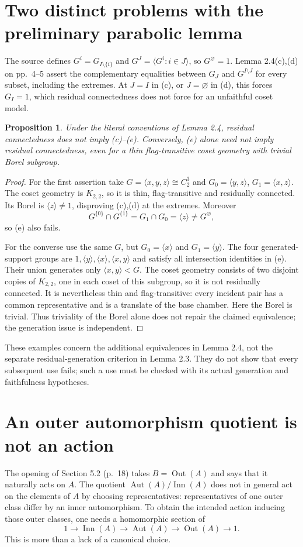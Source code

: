 \documentclass[11pt,a4paper]{article}
\newtheorem{proposition}{Proposition}
\newcommand{\Aut}{\operatorname{Aut}}
\newcommand{\Inn}{\operatorname{Inn}}
\newcommand{\Out}{\operatorname{Out}}
\begin{document}
\section{Two distinct problems with the preliminary parabolic lemma}
The source defines $G^i=G_{I\setminus\{i\}}$ and
$G^J=\langle G^i:i\in J\rangle$, so $G^\varnothing=1$. Lemma 2.4(c),(d)
on pp.~4--5 assert the complementary equalities between $G_J$ and
$G^{I\setminus J}$ for every subset, including the extremes. At $J=I$
in (c), or $J=\varnothing$ in (d), this forces $G_I=1$, which residual
connectedness does not force for an unfaithful coset model.

\begin{proposition}\label{p:lemma}
Under the literal conventions of Lemma 2.4, residual connectedness does
not imply (c)--(e). Conversely, (e) alone need not imply residual
connectedness, even for a thin flag-transitive coset geometry with trivial
Borel subgroup.
\end{proposition}
\begin{proof}
For the first assertion take $G=\langle x,y,z\rangle\cong C_2^3$ and
$G_0=\langle y,z\rangle$, $G_1=\langle x,z\rangle$. The coset geometry is
$K_{2,2}$, so it is thin, flag-transitive and residually connected. Its
Borel is $\langle z\rangle\ne1$, disproving (c),(d) at the extremes.
Moreover
\[
 G^{\{0\}}\cap G^{\{1\}}=G_1\cap G_0=\langle z\rangle
       \ne G^\varnothing,
\]
so (e) also fails.

For the converse use the same $G$, but $G_0=\langle x\rangle$ and
$G_1=\langle y\rangle$. The four generated-support groups are
$1,\langle y\rangle,\langle x\rangle,\langle x,y\rangle$ and satisfy all
intersection identities in (e). Their union generates only
$\langle x,y\rangle<G$. The coset geometry consists of two disjoint copies
of $K_{2,2}$, one in each coset of this subgroup, so it is not residually
connected. It is nevertheless thin and flag-transitive: every incident
pair has a common representative and is a translate of the base chamber.
Here the Borel is trivial. Thus triviality of the Borel alone does not
repair the claimed equivalence; the generation issue is independent.
\end{proof}
These examples concern the additional equivalences in Lemma 2.4, not the
separate residual-generation criterion in Lemma 2.3. They do not show that
every subsequent use fails; such a use must be checked with its actual
generation and faithfulness hypotheses.

\section{An outer automorphism quotient is not an action}
The opening of Section 5.2 (p.~18) takes $B=\Out(A)$ and says that it
naturally acts on $A$. The quotient $\Aut(A)/\Inn(A)$ does not in general
act on the elements of $A$ by choosing representatives: representatives
of one outer class differ by an inner automorphism. To obtain the intended
action inducing those outer classes, one needs a homomorphic section of
\[
 1\longrightarrow\Inn(A)\longrightarrow\Aut(A)
       \longrightarrow\Out(A)\longrightarrow1.
\]
This is more than a lack of a canonical choice.
\end{document}
